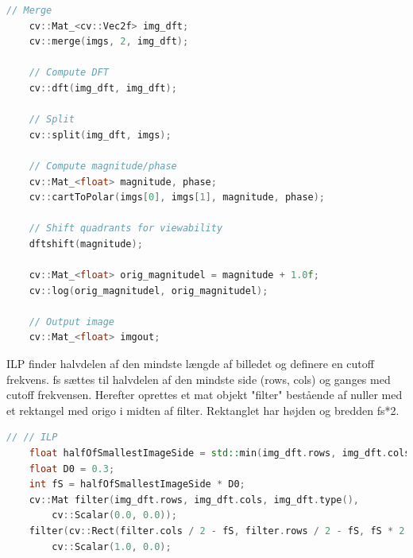 \documentclass{article}
\begin{document}
\begin{lstlisting}[language=c++]
    // Merge
    cv::Mat_<cv::Vec2f> img_dft;
    cv::merge(imgs, 2, img_dft);

    // Compute DFT
    cv::dft(img_dft, img_dft);

    // Split
    cv::split(img_dft, imgs);

    // Compute magnitude/phase
    cv::Mat_<float> magnitude, phase;
    cv::cartToPolar(imgs[0], imgs[1], magnitude, phase);
    
    // Shift quadrants for viewability
    dftshift(magnitude);

    cv::Mat_<float> orig_magnitudel = magnitude + 1.0f;
    cv::log(orig_magnitudel, orig_magnitudel);

    // Output image
    cv::Mat_<float> imgout;
\end{lstlisting}

ILP finder halvdelen af den mindste længde af billedet og definere en cutoff frekvens. fs sættes til halvdelen af den mindste side (rows, cols) og ganges med cutoff frekvensen. \newline 
Herefter oprettes et mat objekt "filter" bestående af nuller med et rektangel med origo i midten af filter. Rektanglet har højden og bredden fs*2. \newline 

\begin{lstlisting}[language=c++]
    // // ILP
    float halfOfSmallestImageSide = std::min(img_dft.rows, img_dft.cols) / 2.0;
    float D0 = 0.3; 
    int fS = halfOfSmallestImageSide * D0;
    cv::Mat filter(img_dft.rows, img_dft.cols, img_dft.type(),
        cv::Scalar(0.0, 0.0));
    filter(cv::Rect(filter.cols / 2 - fS, filter.rows / 2 - fS, fS * 2.0, fS * 2.0)) =
        cv::Scalar(1.0, 0.0);
\end{lstlisting}
\end{document}
